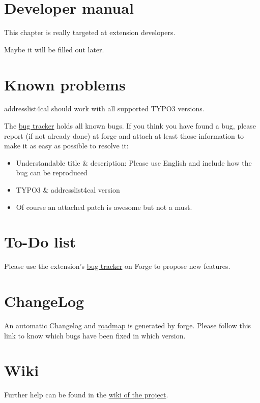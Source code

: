 \documentclass[a4paper,10pt,english]{sphinxtypo3manual}
\begin{document}
\chapter{Developer manual}
\label{index:developer-manual}
This chapter is really targeted at extension developers.

Maybe it will be filled out later.


\chapter{Known problems}
\label{index:known-problems}
addresslist4cal should work with all supported TYPO3 versions.

The \href{http://forge.typo3.org/projects/extension-addresslist4cal/issues}{bug tracker} holds all known bugs. If you think you have found a bug,
please report (if not already done) at forge and attach at least those information
to make it as easy as possible to resolve it:
\begin{itemize}
\item {} 
Understandable title \& description: Please use English and include how
the bug can be reproduced

\item {} 
TYPO3 \& addresslist4cal version

\item {} 
Of course an attached patch is awesome but not a must.

\end{itemize}


\chapter{To-Do list}
\label{index:to-do-list}
Please use the extension's \href{http://forge.typo3.org/projects/extension-addresslist4cal/issues}{bug tracker} on Forge to propose new features.


\chapter{ChangeLog}
\label{index:bug-tracker}\label{index:changelog}
An automatic Changelog and \href{http://forge.typo3.org/projects/extension-addresslist4cal/roadmap}{roadmap} is generated by forge. Please
follow this link to know which bugs have been fixed in which version.


\chapter{Wiki}
\label{index:wiki}\label{index:roadmap}
Further help can be found in the \href{http://forge.typo3.org/projects/extension-addresslist4cal/wiki}{wiki of the project}.
\end{document}
